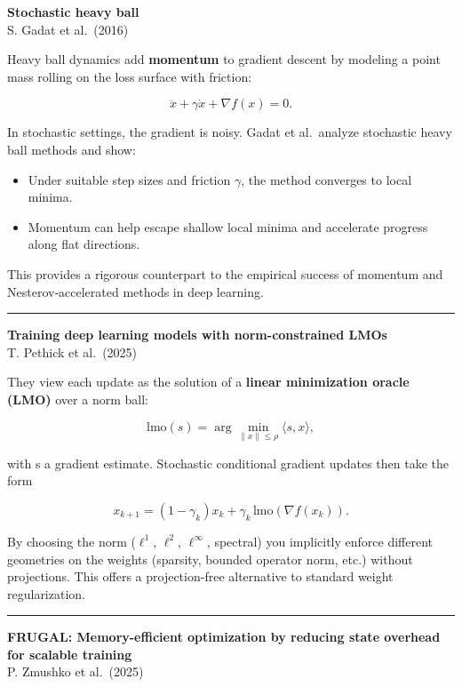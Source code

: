 \documentclass[a5paper]{article}
\let\le\leqslant
\providecommand{\tightlist}{%
  \setlength{\itemsep}{0pt}\setlength{\parskip}{0pt}}
\begin{document}
\textbf{Stochastic heavy ball}\\
S. Gadat et al.~(2016)

Heavy ball dynamics add \textbf{momentum} to gradient descent by
modeling a point mass rolling on the loss surface with friction:

\[ \ddot x + \gamma \dot x + \nabla f(x) = 0. \]

In stochastic settings, the gradient is noisy. Gadat et al.~analyze
stochastic heavy ball methods and show:

\begin{itemize}
\tightlist
\item
  Under suitable step sizes and friction $\gamma$, the method converges to
  local minima.
\item
  Momentum can help escape shallow local minima and accelerate progress
  along flat directions.
\end{itemize}

This provides a rigorous counterpart to the empirical success of
momentum and Nesterov‐accelerated methods in deep learning.

\begin{center}\rule{0.5\linewidth}{0.5pt}\end{center}

\textbf{Training deep learning models with norm-constrained LMOs}\\
T. Pethick et al.~(2025)

They view each update as the solution of a \textbf{linear minimization
oracle (LMO)} over a norm ball:

\[ \mathrm{lmo}(s) = \arg\min_{\|x\|\le\rho}
\langle s,x\rangle, \]

with s a gradient estimate. Stochastic conditional gradient updates then
take the form

\[ x_{k+1} = (1-\gamma_k)x_k +
\gamma_k\,\mathrm{lmo}(\nabla f(x_k)). \]

By choosing the norm ($\ell^1$, $\ell^2$, $\ell^\infty$, spectral) you implicitly enforce
different geometries on the weights (sparsity, bounded operator norm,
etc.) without projections. This offers a projection-free alternative to
standard weight regularization.

\begin{center}\rule{0.5\linewidth}{0.5pt}\end{center}

\textbf{FRUGAL: Memory-efficient optimization by reducing state overhead
for scalable training}\\
P. Zmushko et al.~(2025)
\end{document}
